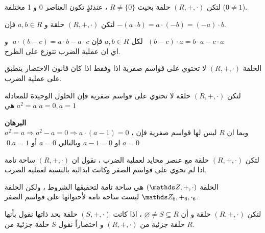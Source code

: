  \begin{theorem}
 	لتكن $(R, +, \cdot)$ حلقة بحيث $R\neq \{0\}$ ، عندئذٍ تكون العناصر 0 و 1 مختلفة ($0\neq 1$).
 \end{theorem}
 
 \begin{theorem}
 	لتكن $(R, +, \cdot)$ حلقة و $a,b\in R$ فإن 
 	$-(a\cdot b) = a\cdot (-b) = (-a)\cdot b$.
 \end{theorem}
 
 \begin{corollary}
 	لكل $a,b\in R$ فإن
 	$a\cdot (b-c) = a\cdot b - a\cdot c$\,\,  و \,\,$(b-c) \cdot a = b\cdot a - c\cdot a$\\
 	اي ان عملية الضرب تتوزع على الطرح.
 \end{corollary}
 
 \begin{theorem}
 	الحلقة $(R, +, \cdot)$ لا تحتوي على قواسم صفرية اذا وفقط اذا كان قانون الاختصار ينطبق على عملية الضرب.
 \end{theorem}
 
 \begin{corollary}
 	لتكن $(R, +, \cdot)$ حلقة لا تحتوي على قواسم صفرية فإن الحلول الوحيدة للمعادلة $a^2=a$ هي  $a=0, a=1$ 
 \end{corollary}
 \noindent
 \textbf{البرهان}\\
 \noindent
 $a^2 =a\Rightarrow a^2-a=0\Rightarrow a\cdot(a-1)=0 $ ، وبما ان $R$ ليس لها قواسم صفرية فإن $a=0$ او $a-1=0$ وبالتالي $a=0 $ أو $a=1$.\qed
 
 \begin{definition}
 	لتكن $(R, +, \cdot)$ حلقة مع عنصر محايد لعملية الضرب ، نقول ان $(R, +, \cdot)$ ساحة تامة اذا لم تحوي على قواسم الصفر وكانت ابدالية بالنسبة لعملية الضرب.
 \end{definition}
 
 \begin{example}
 	الحلقة $(\Z, +, \cdot)$ هي ساحة تامة لتحقيقها الشروط ، ولكن الحلقة 
 	$\Z_6, +_6, \cdot_6$ ليست ساحة تامة لأحتوائها على قواسم الصفر.
 \end{example}
 
 
 \begin{definition}
 	لتكن $(R, +, \cdot)$ حلقة و أن $\varnothing\neq S\subseteq R$ ، اذا كانت $(S, +, \cdot)$ حلقة بحد ذاتها نقول بأنها حلقة جزئية من $(R, +, \cdot)$ و اختصاراً نقول $S$ حلقة جزئية من $R$.
 \end{definition}
 
